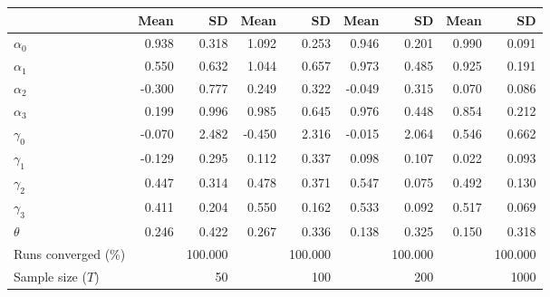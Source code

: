 
\begin{tabular}[t]{lrrrrrrrr}
\toprule
  & Mean & SD & Mean  & SD  & Mean   & SD   & Mean    & SD   \\
\midrule
$\alpha_{0}$ & 0.938 & 0.318 & 1.092 & 0.253 & 0.946 & 0.201 & 0.990 & 0.091\\
$\alpha_{1}$ & 0.550 & 0.632 & 1.044 & 0.657 & 0.973 & 0.485 & 0.925 & 0.191\\
$\alpha_{2}$ & -0.300 & 0.777 & 0.249 & 0.322 & -0.049 & 0.315 & 0.070 & 0.086\\
$\alpha_{3}$ & 0.199 & 0.996 & 0.985 & 0.645 & 0.976 & 0.448 & 0.854 & 0.212\\
$\gamma_{0}$ & -0.070 & 2.482 & -0.450 & 2.316 & -0.015 & 2.064 & 0.546 & 0.662\\
$\gamma_{1}$ & -0.129 & 0.295 & 0.112 & 0.337 & 0.098 & 0.107 & 0.022 & 0.093\\
$\gamma_{2}$ & 0.447 & 0.314 & 0.478 & 0.371 & 0.547 & 0.075 & 0.492 & 0.130\\
$\gamma_{3}$ & 0.411 & 0.204 & 0.550 & 0.162 & 0.533 & 0.092 & 0.517 & 0.069\\
$\theta$ & 0.246 & 0.422 & 0.267 & 0.336 & 0.138 & 0.325 & 0.150 & 0.318\\
Runs converged (\%) &  & 100.000 &  & 100.000 &  & 100.000 &  & 100.000\\
Sample size ($T$) &  & 50 &  & 100 &  & 200 &  & 1000\\
\bottomrule
\end{tabular}
